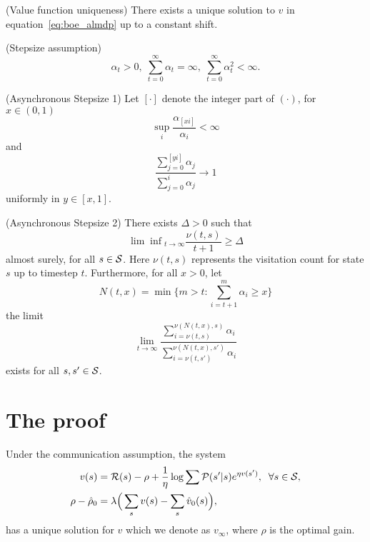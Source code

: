 
\begin{assumption}
 (Value function uniqueness) There exists a unique solution to $v$ in equation~\eqref{eq:boe_almdp} up to a constant shift.
  \label{ass:uniqueness}
\end{assumption}
\begin{assumption} (Stepsize assumption)
    \begin{equation*}
        \alpha_t > 0,\;\sum_{t=0}^{\infty} \alpha_t = \infty,\;\sum_{t=0}^{\infty} \alpha_t^2 < \infty.
    \end{equation*}
      \label{ass:stepsize1}
\end{assumption}
\begin{assumption}
    (Asynchronous Stepsize 1) Let $[\cdot]$ denote the integer part of $(\cdot)$, for $x\in(0, 1)$
    \begin{equation*}
        \sup_i \frac{\alpha_{[xi]}}{\alpha_i} < \infty
    \end{equation*}
    and
    \begin{equation*}
        \frac{\sum_{j=0}^{[yi]}\alpha_j}{\sum_{j=0}^i\alpha_j}\rightarrow 1
    \end{equation*}
    \label{ass:stepsize2}
    uniformly in $y \in[x, 1]$.
\end{assumption}

\begin{assumption}
    (Asynchronous Stepsize 2) There exists $\Delta>0$ such that
    \begin{equation*}
        {\lim\inf}_{t\rightarrow\infty} \frac{\nu(t, s)}{t+1}\geq \Delta
    \end{equation*}
    almost surely, for all $s\in\mathcal{S}$. Here $\nu(t, s)$ represents the visitation count for state $s$ up to timestep $t$. Furthermore, for all $x > 0$, let
    \begin{equation*}
        N(t, x) = \min \Big\{m > t: \sum_{i=t+1}^m \alpha_i \geq x \Big\}
    \end{equation*}
    \label{ass:stepsize3}
    the limit 
    \begin{equation*}
       \lim_{t\rightarrow\infty} \frac{\sum_{i=\nu(t, s)}^{\nu(N(t, x), s)} \alpha_i}{\sum_{i=\nu(t, s')}^{\nu(N(t, x), s')} \alpha_i}
    \end{equation*}
    exists for all $s, s'\in\mathcal{S}$.
\end{assumption}
\section{The proof}
Under the communication assumption, the system
\begin{align}
    v(s) &= \mathcal{R}(s) - \rho + \frac{1}{\eta} \log \sum {\mathcal{P}(s'\lvert s) e^{\eta v(s')}},\;\;\forall s\in\mathcal{S}, \\
    \rho - \hat\rho_0 &= \lambda \Big(\sum_s v(s) - \sum_s\hat v_0(s)\Big),
\end{align}
has a unique solution for $v$ which we denote as $v_\infty$, where $\rho$ is the optimal gain.

